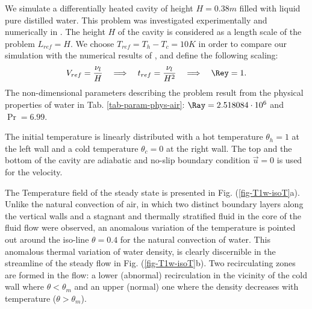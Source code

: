 We simulate a differentially heated cavity of height $H = 0.38 m$ filled with liquid pure distilled water.
This problem was investigated experimentally and numerically in \cite{Giangi-2000,Kowalewski-1999,Kowalewski-2003}.
The height $H$ of the cavity is considered as a length scale of the problem $L_{ref} = H$. 
We choose $T_{ref} = T_h - T_c = 10 K$ in order to compare our simulation with the numerical results of \cite{Kowalewski-2003},
and define the following scaling:
\begin{equation} \label{eq-def-scal-1}
   V_{ref} = \frac{\nu_l}{H} 
   \quad \Longrightarrow \quad t_{ref} = \frac{\nu_l}{H^2}
   \quad \Longrightarrow \quad \Rey = 1.
\end{equation} 
The non-dimensional parameters describing the problem result from the physical properties of water in Tab. \ref{tab-param-phys-air}: $\Ray=2.518084\cdot 10^{6}$ and $\Pr=6.99$. %

The initial temperature is linearly distributed with a hot temperature $\theta_h =1$ at the left wall and a cold temperature $\theta_c=0$ at the right wall. %
The top and the bottom of the cavity are adiabatic and no-slip boundary condition $\vec u = 0$ is used for the velocity.

The Temperature field of the steady state is presented in Fig. (\ref{fig-T1w-isoT}a).
Unlike the natural convection of air, in which two distinct boundary layers along the vertical walls and a stagnant and thermally stratified fluid in the core of the fluid flow were observed, an anomalous variation of the temperature is pointed out around the iso-line $\theta = 0.4$ for the natural convection of water.
This anomalous thermal variation of water density, is clearly discernible in the streamline of the steady flow in Fig. (\ref{fig-T1w-isoT}b).
Two recirculating zones are formed in the flow: a lower (abnormal) recirculation  in the vicinity of the cold wall where $\theta<\theta_m$ and an upper (normal) one where the density decreases with temperature ($\theta>\theta_m$).

